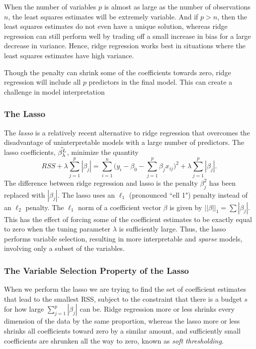 \documentclass{article}
\numberwithin{equation}{section}
\begin{document}
\begin{enumerate}
When the number of variables $p$ is almost as large as the number of observations $n$, the least squares estimates will be extremely variable. And if $p>n$, then the least squares estimates do not even have a unique solution, whereas ridge regression can still perform well by trading off a small increase in bias for a large decrease in variance.  Hence, ridge regression works best in situations where the least squares estimates have high variance.

Though the penalty can shrink some of the coefficients towards zero, ridge regression will include all $p$ predictors in the final model. This can create a challenge in model interpretation

\subsubsection{The Lasso}
The \textit{lasso} is a relatively recent alternative to ridge regression that overcomes the disadvantage of uninterpretable models with a large number of predictors. The lasso coefficients, $ \Tilde{\beta^L_\lambda}$, minimize the quantity
\begin{equation}
    RSS + \lambda \sum_{j=1}^{p} |\beta_j| 
    = \sum_{i=1}^{n} \Bigg( y_i - \beta_0 - \sum_{j=1}^{p} \beta_j x_{ij} \Bigg )^2 +  \lambda \sum_{j=1}^{p} |\beta_j| .
\end{equation}
The difference between ridge regression and lasso is the penalty $\beta_j^2$ has been replaced with $|\beta_j|$. The lasso uses an $\ell_1$ (pronounced ``ell 1") penalty instead of an $\ell_2$ penalty. The $\ell_1$ norm of a coefficient vector $\beta$ is given by $||\beta||_1 = \sum |\beta_j|$. This has the effect of forcing some of the coefficient estimates to be exactly equal to zero when the tuning parameter $\lambda$ is sufficiently large. Thus, the lasso performs variable selection, resulting in more interpretable and \textit{sparse} models, involving only a subset of the variables.

\subsubsection*{The Variable Selection Property of the Lasso}
When we perform the lasso we are trying to find the set of coefficient estimates that lead to the smallest RSS, subject to the constraint that there is a budget $s$ for how large 
$\sum_{j=1}^p |\beta_j |$ can be. Ridge regression more or less shrinks every dimension of the data by the same proportion, whereas the lasso more or less shrinks all coefficients toward zero by a similar amount, and sufficiently small coefficients are shrunken all the way to zero, known as \textit{soft thresholding}.



\end{enumerate}
\end{document}
